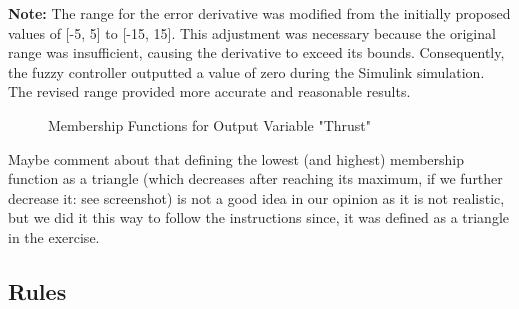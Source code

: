 \documentclass[12pt]{article}
\begin{document}
\textbf{Note:}
The range for the error derivative was modified from the initially proposed values of [-5, 5] to [-15, 15]. This adjustment was necessary because the original range was insufficient, causing the derivative to exceed its bounds. Consequently, the fuzzy controller outputted a value of zero during the Simulink simulation. The revised range provided more accurate and reasonable results.

\begin{figure}[H]
    \centering
    \caption{Membership Functions for Output Variable "Thrust"}
\end{figure}



Maybe comment about that defining the lowest (and highest) membership function as a triangle (which decreases after reaching its maximum, if we further decrease it: see screenshot) is not a good idea in our opinion as it is not realistic, but we did it this way to follow the instructions since, it was defined as a triangle in the exercise.

\subsection{Rules}
\end{document}
